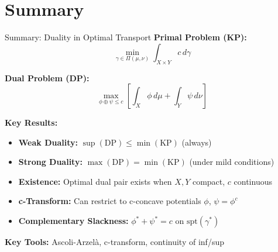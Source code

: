 \documentclass[aspectratio=169]{beamer}
\begin{document}
\section{Summary}

\begin{frame}{Summary: Duality in Optimal Transport}
\textbf{Primal Problem (KP):}
\[
\min_{\gamma \in \Pi(\mu,\nu)} \int_{X \times Y} c \, d\gamma
\]

\vspace{0.2cm}
\textbf{Dual Problem (DP):}
\[
\max_{\phi \oplus \psi \leq c} \left[ \int_X \phi \, d\mu + \int_Y \psi \, d\nu \right]
\]

\vspace{0.3cm}
\textbf{Key Results:}
\begin{itemize}
    \item \textbf{Weak Duality:} $\sup(\text{DP}) \leq \min(\text{KP})$ (always)
    \item \textbf{Strong Duality:} $\max(\text{DP}) = \min(\text{KP})$ (under mild conditions)
    \item \textbf{Existence:} Optimal dual pair exists when $X, Y$ compact, $c$ continuous
    \item \textbf{c-Transform:} Can restrict to c-concave potentials $\phi$, $\psi = \phi^c$
    \item \textbf{Complementary Slackness:} $\phi^* + \psi^* = c$ on $\text{spt}(\gamma^*)$
\end{itemize}

\vspace{0.2cm}
\textbf{Key Tools:} Ascoli-Arzel\`a, c-transform, continuity of inf/sup
\end{frame}
\end{document}
